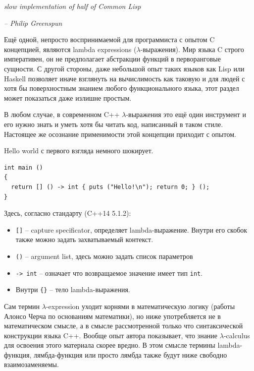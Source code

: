 \documentclass[a4paper,12pt,oneside]{article}
\begin{document}
\hfill\textit{slow implementation of half of Common Lisp}{\vspace{0.5em}}

\hfill\textit{-- Philip Greenspun}

Ещё одной, непросто воспринимаемой для программиста с опытом C концепцией, являются lambda expressions ($\lambda$-выражения). Мир языка C строго императивен, он не предполагает абстракции функций в перворанговые сущности. С другой стороны, даже небольшой опыт таких языков как Lisp или Haskell позволяет иначе взглянуть на вычислимость как таковую и для людей с хотя бы поверхностным знанием любого функционального языка, этот раздел может показаться даже излишне простым.

В любом случае, в современном C++ $\lambda$-выражения это ещё один инструмент и его нужно знать и уметь хотя бы читать код, написанный в таком стиле. Настоящее же осознание применимости этой концепции приходит с опытом. 

Hello world с первого взгляда немного шокирует.

\begin{lstlisting}
int main ()
{
  return [] () -> int { puts ("Hello!\n"); return 0; } (); 
}
\end{lstlisting}

Здесь, согласно стандарту (C++14 5.1.2): 

\begin{itemize}
\item \lstinline![]! -- capture specificator, определяет lambda-выражение. Внутри его скобок также можно задать захватываемый контекст.

\item \lstinline!()! -- argument list, здесь можно задать список параметров

\item \lstinline!-> int! -- означает что возвращаемое значение имеет тип \lstinline!int!.

\item Внутри \lstinline!{}! -- тело lambda-выражения.
\end{itemize}

Сам термин $\lambda$-expression уходит корнями в математическую логику (работы Алонсо Черча по основаниям математики), но ниже употребляется не в математическом смысле, а в смысле рассмотренной только что синтаксической конструкции языка C++. Вообще опыт автора показывает, что знание $\lambda$-calculus для освоения этого материала скорее вредно. В этом смысле термины lambda-функция, лямбда-функция или просто лямбда также будут ниже свободно взаимозаменяемы.
\end{document}
